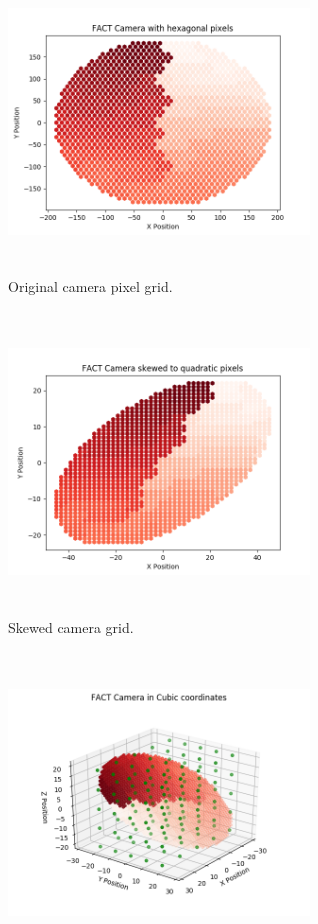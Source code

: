 \documentclass[12pt]{article}
\begin{document}
\begin{figure}[!htb]
\centering
\begin{subfigure}[t]{.475\textwidth}
  \centering
  \includegraphics[width=8cm, height=8cm, keepaspectratio]{Unskewed_Mapping.png}
  \caption{Original camera pixel grid.}
  \label{fig:Unskewed}
\end{subfigure}
\hfill
\begin{subfigure}[t]{.475\textwidth}
  \centering
  \includegraphics[width=8cm, height=8cm, keepaspectratio]{Skewed_Mapping.png}
  \caption{Skewed camera grid.}
  \label{fig:Skewed}
\end{subfigure}
\centering
\begin{subfigure}[t]{.475\textwidth}
  \centering
  \includegraphics[width=8cm, height=8cm, keepaspectratio]{Cubic_Mapping_FACT_Face.png}

\end{subfigure}
\end{figure}
\end{document}
